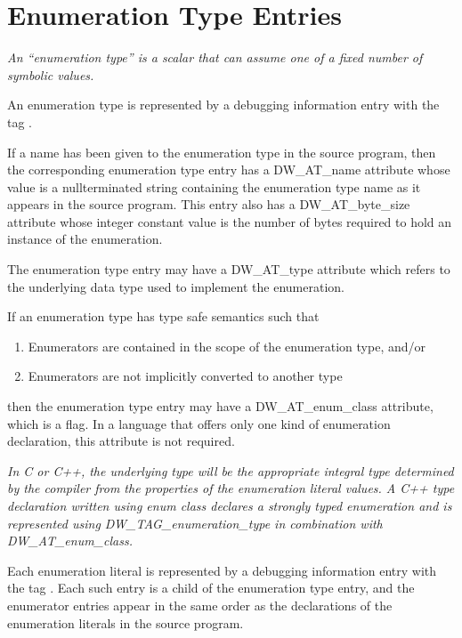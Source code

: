 \section{Enumeration Type Entries}
\label{chap:enumerationtypeentries}

\textit{An “enumeration type” is a scalar that can assume one of
a fixed number of symbolic values.}

An enumeration type is represented by a debugging information
entry with the tag 
.

If a name has been given to the enumeration type in the source
program, then the corresponding enumeration type entry has
a DW\_AT\_name attribute whose value is a null\dash terminated
string containing the enumeration type name as it appears
in the source program. This entry also has a DW\_AT\_byte\_size
attribute whose integer constant value is the number of bytes
required to hold an instance of the enumeration.

The enumeration type entry may have a DW\_AT\_type attribute
which refers to the underlying data type used to implement
the enumeration.

If an enumeration type has type safe semantics such that

\begin{enumerate}[1.]
\item Enumerators are contained in the scope of the enumeration type, and/or

\item Enumerators are not implicitly converted to another type
\end{enumerate}

then the enumeration type entry may have a DW\_AT\_enum\_class
attribute, which is a flag. In a language that offers only
one kind of enumeration declaration, this attribute is not
required.

\textit{In C or C++, the underlying type will be the appropriate
integral type determined by the compiler from the properties of
the enumeration literal values. A C++ type declaration written
using enum class declares a strongly typed enumeration and
is represented using DW\_TAG\_enumeration\_type in combination
with DW\_AT\_enum\_class.}

Each enumeration literal is represented by a debugging
information entry with the 
tag . 
Each
such entry is a child of the enumeration type entry, and the
enumerator entries appear in the same order as the declarations
of the enumeration literals in the source program.

